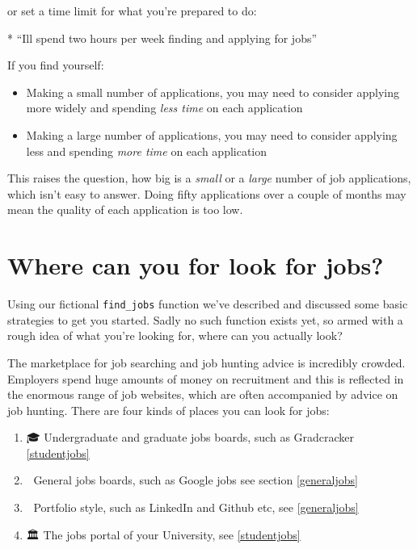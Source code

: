 \documentclass[
]{book}
\newenvironment{Shaded}{\begin{snugshade}}{\end{snugshade}}
\newcommand{\NormalTok}[1]{#1}
\newcommand{\SpecialStringTok}[1]{\textcolor[rgb]{0.31,0.60,0.02}{#1}}
\providecommand{\tightlist}{%
  \setlength{\itemsep}{0pt}\setlength{\parskip}{0pt}}
\begin{document}
or set a time limit for what you're prepared to do:

\begin{Shaded}
\begin{Highlighting}[]
\SpecialStringTok{* }\NormalTok{“I\textquotesingle{}ll spend two hours per week finding and applying for jobs”}
\end{Highlighting}
\end{Shaded}

If you find yourself:

\begin{itemize}
\tightlist
\item
  Making a small number of applications, you may need to consider applying more widely and spending \emph{less time} on each application
\item
  Making a large number of applications, you may need to consider applying less and spending \emph{more time} on each application
\end{itemize}

This raises the question, how big is a \emph{small} or a \emph{large} number of job applications, which isn't easy to answer. Doing fifty applications over a couple of months may mean the quality of each application is too low.

\hypertarget{looking}{%
\section{Where can you for look for jobs?}\label{looking}}

Using our fictional \texttt{find\_jobs} function we've described and discussed some basic strategies to get you started. Sadly no such function exists yet, so armed with a rough idea of what you're looking for, where can you actually look?

The marketplace for job searching and job hunting advice is incredibly crowded. Employers spend huge amounts of money on recruitment and this is reflected in the enormous range of job websites, which are often accompanied by advice on job hunting. There are four kinds of places you can look for jobs:

\begin{enumerate}
\def\labelenumi{\arabic{enumi}.}
\tightlist
\item
  🎓 Undergraduate and graduate jobs boards, such as Gradcracker \ref{studentjobs}
\item
  👀 General jobs boards, such as Google jobs see section \ref{generaljobs}
\item
  🎨 Portfolio style, such as LinkedIn and Github etc, see \ref{generaljobs}
\item
  🏛️ The jobs portal of your University, see \ref{studentjobs}
\end{enumerate}
\end{document}
